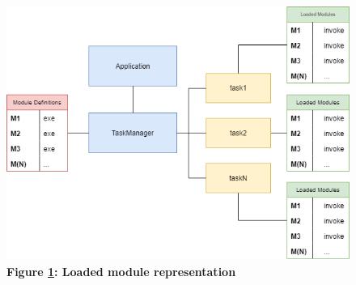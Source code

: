 \begin{figure}[H]
    \centering
    \begin{mdframed}
        \centering
        \includegraphics[scale=0.62]{./resources/figures/fig-module-memory.png}
    \end{mdframed}
    \caption[Loaded module representation]{\textbf{Figure \ref{fig-nETL-module-memory}: Loaded module representation}}
    \label{fig-nETL-module-memory}
\end{figure}